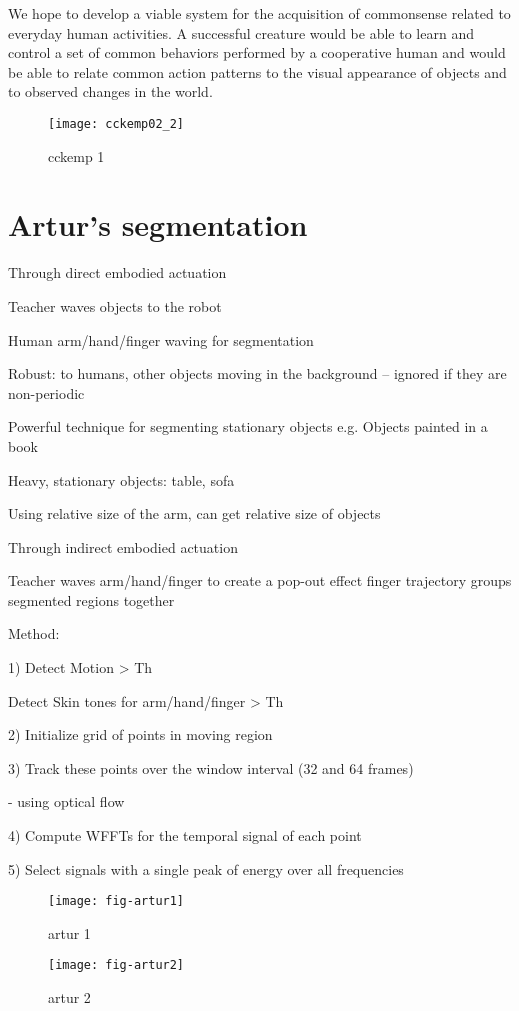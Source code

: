We hope to develop a viable system for the acquisition of commonsense
related to everyday human activities. A successful creature would be
able to learn and control a set of common behaviors performed by a
cooperative human and would be able to relate common action patterns
to the visual appearance of objects and to observed changes in the
world.

\begin{figure}[bt]
\texttt{[image: cckemp02\_2]}
\caption
{
cckemp 1
}
\label{fig:cckemp1}
\end{figure}



\section{Artur's segmentation}

Through direct embodied actuation

  Teacher waves objects to the robot

Human arm/hand/finger waving for segmentation

Robust: to humans, other objects moving in the background --
ignored if they are non-periodic

Powerful technique for segmenting stationary objects e.g. Objects
painted in a book

Heavy, stationary objects: table, sofa

Using relative size of the arm, can get relative size of objects

Through indirect embodied actuation

 Teacher waves arm/hand/finger to create a pop-out effect
       finger trajectory groups segmented regions together

Method:

1)  Detect Motion > Th

     Detect Skin tones for arm/hand/finger  > Th

2) Initialize grid of points in moving region

3) Track these points over the window interval (32 and 64 frames)

     - using optical flow

4) Compute WFFTs for the temporal signal of each point

5) Select signals with a single peak of energy over all frequencies 


\begin{figure}[bt]
\texttt{[image: fig-artur1]}
\caption
{
artur 1
}
\label{fig:artur1}
\end{figure}


\begin{figure}[bt]
\texttt{[image: fig-artur2]}
\caption
{
artur 2
}
\label{fig:artur2}
\end{figure}


